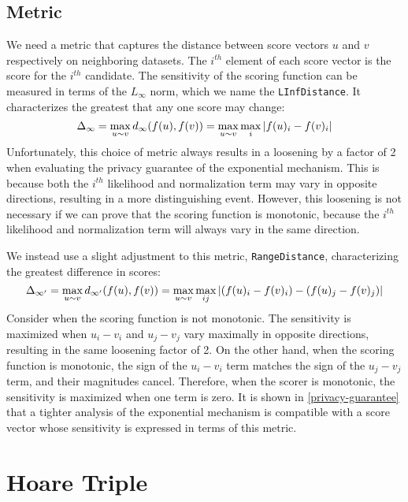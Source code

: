 \documentclass{article}
\begin{document}
\subsection{Metric}
We need a metric that captures the distance between score vectors $u$ and $v$ respectively on neighboring datasets. 
The $i^{th}$ element of each score vector is the score for the $i^{th}$ candidate.
The sensitivity of the scoring function can be measured in terms of the $L_\infty$ norm, which we name the \texttt{LInfDistance}. 
It characterizes the greatest that any one score may change:
\begin{equation}
    \Delta_{\infty} = \max_{u \sim v} d_{\infty}(f(u), f(v)) = \max\limits_{u \sim v} \max\limits_{i} \abs{f(u)_i - f(v)_i}
\end{equation}
Unfortunately, this choice of metric always results in a loosening by a factor of 2 when evaluating the privacy guarantee of the exponential mechanism.
This is because both the $i^{th}$ likelihood and normalization term may vary in opposite directions, resulting in a more distinguishing event.
However, this loosening is not necessary if we can prove that the scoring function is monotonic, because the $i^{th}$ likelihood and normalization term will always vary in the same direction.

We instead use a slight adjustment to this metric, \texttt{RangeDistance}, characterizing the greatest difference in scores:
\begin{equation}
    \Delta_{\infty'} = \max_{u \sim v} d_{\infty'}(f(u), f(v)) = \max\limits_{u \sim v} \max\limits_{ij} \abs{(f(u)_i - f(v)_i) - (f(u)_j - f(v)_j)}
\end{equation}
Consider when the scoring function is not monotonic.
The sensitivity is maximized when $u_i - v_i$ and $u_j - v_j$ vary maximally in opposite directions, resulting in the same loosening factor of 2.
On the other hand, when the scoring function is monotonic, the sign of the $u_i - v_i$ term matches the sign of the $u_j - v_j$ term,
and their magnitudes cancel.
Therefore, when the scorer is monotonic, the sensitivity is maximized when one term is zero. 
It is shown in \ref{privacy-guarantee} that a tighter analysis of the exponential mechanism is compatible with a score vector whose sensitivity is expressed in terms of this metric.



\section{Hoare Triple}
\end{document}

